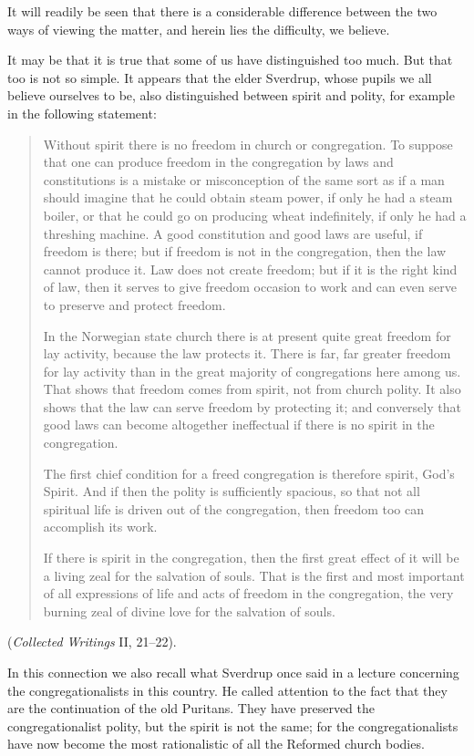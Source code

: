 It will readily be seen that there is a considerable difference between the two ways of viewing the matter, and herein lies the difficulty, we believe.

It may be that it is true that some of us have distinguished too much. But that too is not so simple. It appears that the elder Sverdrup, whose pupils we all believe ourselves to be, also distinguished between spirit and polity, for example in the following statement:

\begin{quote}
Without spirit there is no freedom in church or congregation. To suppose that one can produce freedom in the congregation by laws and constitutions is a mistake or misconception of the same sort as if a man should imagine that he could obtain steam power, if only he had a steam boiler, or that he could go on producing wheat indefinitely, if only he had a threshing machine. A good constitution and good laws are useful, if freedom is there; but if freedom is not in the congregation, then the law cannot produce it. Law does not create freedom; but if it is the right kind of law, then it serves to give freedom occasion to work and can even serve to preserve and protect freedom.

In the Norwegian state church there is at present quite great freedom for lay activity, because the law protects it. There is far, far greater freedom for lay activity than in the great majority of congregations here among us. That shows that freedom comes from spirit, not from church polity. It also shows that the law can serve freedom by protecting it; and conversely that good laws can become altogether ineffectual if there is no spirit in the congregation.

The first chief condition for a freed congregation is therefore spirit, God’s Spirit. And if then the polity is sufficiently spacious, so that not all spiritual life is driven out of the congregation, then freedom too can accomplish its work.

If there is spirit in the congregation, then the first great effect of it will be a living zeal for the salvation of souls. That is the first and most important of all expressions of life and acts of freedom in the congregation, the very burning zeal of divine love for the salvation of souls.
\end{quote}

\noindent(\textit{Collected Writings} II, 21--22).

In this connection we also recall what Sverdrup once said in a lecture concerning the congregationalists in this country. He called attention to the fact that they are the continuation of the old Puritans. They have preserved the congregationalist polity, but the spirit is not the same; for the congregationalists have now become the most rationalistic of all the Reformed church bodies.

